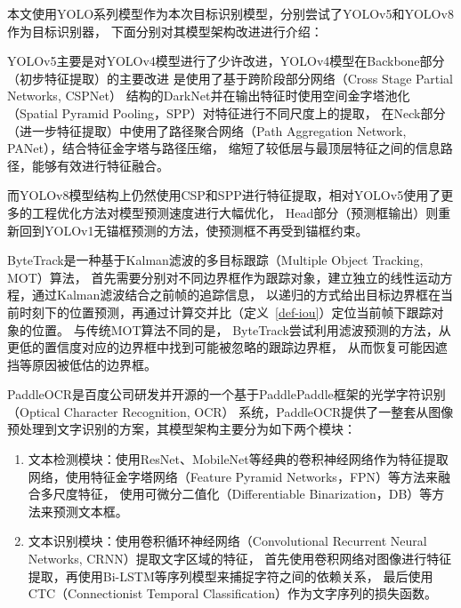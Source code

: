 
\label{chpt-perceptron}
本文使用YOLO系列模型作为本次目标识别模型，分别尝试了YOLOv5和YOLOv8作为目标识别器，
下面分别对其模型架构改进进行介绍：

YOLOv5主要是对YOLOv4模型进行了少许改进，YOLOv4模型在Backbone部分（初步特征提取）的主要改进
是使用了基于跨阶段部分网络（Cross Stage Partial Networks, CSPNet）
结构的DarkNet并在输出特征时使用空间金字塔池化（Spatial Pyramid Pooling，SPP）对特征进行不同尺度上的提取，
在Neck部分（进一步特征提取）中使用了路径聚合网络（Path Aggregation Network, PANet），结合特征金字塔与路径压缩，
缩短了较低层与最顶层特征之间的信息路径，能够有效进行特征融合。

而YOLOv8模型结构上仍然使用CSP和SPP进行特征提取，相对YOLOv5使用了更多的工程优化方法对模型预测速度进行大幅优化，
Head部分（预测框输出）则重新回到YOLOv1无锚框预测的方法，使预测框不再受到锚框约束。

ByteTrack是一种基于Kalman滤波的多目标跟踪（Multiple Object Tracking, MOT）算法，
首先需要分别对不同边界框作为跟踪对象，建立独立的线性运动方程，通过Kalman滤波结合之前帧的追踪信息，
以递归的方式给出目标边界框在当前时刻下的位置预测，再通过计算交并比（定义~\ref{def-iou}）定位当前帧下跟踪对象的位置。
与传统MOT算法不同的是，
ByteTrack尝试利用滤波预测的方法，从更低的置信度对应的边界框中找到可能被忽略的跟踪边界框，
从而恢复可能因遮挡等原因被低估的边界框。

PaddleOCR是百度公司研发并开源的一个基于PaddlePaddle框架的光学字符识别（Optical Character Recognition, OCR）
系统，PaddleOCR提供了一整套从图像预处理到文字识别的方案，其模型架构主要分为如下两个模块：
\begin{enumerate}
  \item 文本检测模块：使用ResNet、MobileNet等经典的卷积神经网络作为特征提取网络，使用特征金字塔网络（Feature Pyramid Networks，FPN）等方法来融合多尺度特征，
  使用可微分二值化（Differentiable Binarization，DB）等方法来预测文本框。
  \item 文本识别模块：使用卷积循环神经网络（Convolutional Recurrent Neural Networks, CRNN）提取文字区域的特征，
  首先使用卷积网络对图像进行特征提取，再使用Bi-LSTM等序列模型来捕捉字符之间的依赖关系，
  最后使用CTC（Connectionist Temporal Classification）作为文字序列的损失函数。
\end{enumerate}

